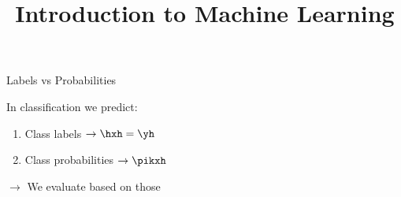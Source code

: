 \documentclass[11pt,compress,t,notes=noshow, xcolor=table]{beamer}
\title{Introduction to Machine Learning}
\institute{\href{https://compstat-lmu.github.io/lecture_i2ml/}{compstat-lmu.github.io/lecture\_i2ml}}
\date{}
\begin{document}














\begin{vbframe}{Labels vs Probabilities}

\lz
In classification we predict:

\lz
\begin{enumerate}
\item Class labels $\rightarrow \hxh = \yh$
\item Class probabilities $\rightarrow \pikxh$
\end{enumerate}

\lz
$\rightarrow$ We evaluate based on those


\end{vbframe}
\end{document}

